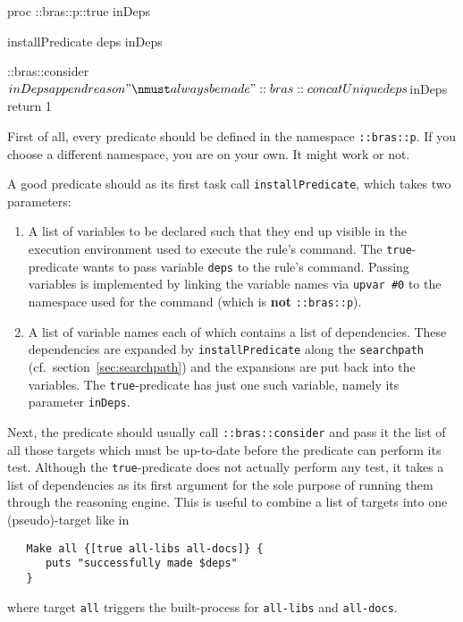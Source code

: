 \documentclass[11pt]{scrartcl}
\begin{document}
\begin{center}
\begin{listing}[1]{1}
  proc ::bras::p::true {{inDeps {}}} { 
    installPredicate deps inDeps
    
    ::bras::consider $inDeps
    
    append reason "\nmust always be made" 
    ::bras::concatUnique deps
    $inDeps return 1
  }
\end{listing}
\end{center}

First of all, every predicate should be defined in the namespace
\texttt{::bras::p}. If you choose a different namespace, you are on
your own. It might work or not.

A good predicate should as its first task call
\texttt{installPredicate}, which takes two parameters:
\begin{enumerate}
\item A list of variables to be declared such that they end up visible
  in the execution environment used to execute the rule's command. The
  \texttt{true}-predicate wants to pass variable \texttt{deps} to the
  rule's command. Passing variables is implemented by linking the
  variable names via \texttt{upvar \#0} to the namespace used for the
  command (which is \textbf{not} \texttt{::bras::p}).
\item A list of variable names each of which contains a list of
  dependencies. These dependencies are expanded by
  \texttt{installPredicate} along the \texttt{searchpath} (cf.\ 
  section~\ref{sec:searchpath}) and the expansions are put back into
  the variables. The \texttt{true}-predicate has just one such
  variable, namely its parameter \texttt{inDeps}.
\end{enumerate}

Next, the predicate should usually call \texttt{::bras::consider} and
pass it the list of all those targets which must be up-to-date before
the predicate can perform its test. Although the
\texttt{true}-predicate does not actually perform any test, it takes a 
list of dependencies as its first argument for the sole purpose of
running them through the reasoning engine. This is useful to combine a 
list of targets into one (pseudo)-target like in

\begin{verbatim}
   Make all {[true all-libs all-docs]} {
      puts "successfully made $deps"
   }
\end{verbatim}
where target \texttt{all} triggers the built-process for
\texttt{all-libs} and \texttt{all-docs}.
\end{document}

